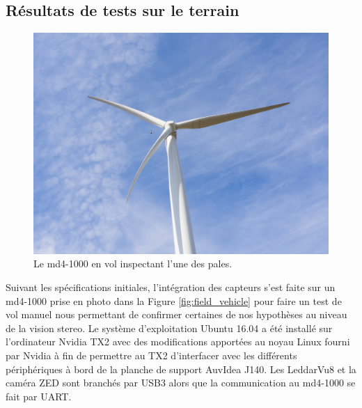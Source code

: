 \clearpage
\subsection{Résultats de tests sur le terrain}
\label{subsec:results_field}

\begin{figure}[htb]
  \centering
  \includegraphics[trim=180 200 180 180,clip,width=\linewidth]{images/test_eolienne.jpg}
  \caption{Le md4-1000 en vol inspectant l'une des pales.}
  \label{fig:test_eolienne}
\end{figure}

Suivant les spécifications initiales, l'intégration des capteurs s'est faite sur un md4-1000 prise en photo dans la Figure \ref{fig:field_vehicle} pour faire un test de vol manuel nous permettant de confirmer certaines de nos hypothèses au niveau de la vision stereo. Le système d'exploitation Ubuntu 16.04 a été installé sur l'ordinateur Nvidia TX2 avec des modifications apportées au noyau Linux fourni par Nvidia à fin de permettre au TX2 d'interfacer avec les différents périphériques à bord de la planche de support AuvIdea J140. Les LeddarVu8 et la caméra ZED sont branchés par USB3 alors que la communication au md4-1000 se fait par UART.

